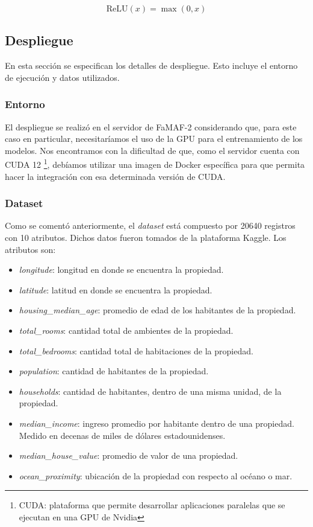 \documentclass[11pt]{article}
\let\Oldsubsection\subsection
\renewcommand{\subsection}{\FloatBarrier\Oldsubsection}
\let\Oldsubsubsection\subsubsection
\renewcommand{\subsubsection}{\FloatBarrier\Oldsubsubsection}
\newcommand{\english}[1]{\textit{#1}}
\begin{document}
\begin{equation}
\text{ReLU}(x) = \max(0, x)
\end{equation}


\subsection{Despliegue}

En esta sección se especifican los detalles de despliegue. Esto incluye el entorno de ejecución y datos utilizados.

\subsubsection{Entorno}

El despliegue se realizó en el servidor de FaMAF-2 considerando que, para este caso en particular, necesitaríamos el uso de la GPU para el entrenamiento de los modelos. Nos encontramos con la dificultad de que, como el servidor cuenta con CUDA 12 \footnote{CUDA: plataforma que permite desarrollar aplicaciones paralelas que se ejecutan en una GPU de Nvidia}, debíamos utilizar una imagen de Docker específica para que permita hacer la integración con esa determinada versión de CUDA.

\subsubsection{Dataset}

Como se comentó anteriormente, el \english{dataset} está compuesto por 20640 registros con 10 atributos. Dichos datos fueron tomados de la plataforma Kaggle. Los atributos son:

\begin{itemize}
    \item \english{longitude}: longitud en donde se encuentra la propiedad.
    \item \english{latitude}: latitud en donde se encuentra la propiedad.
    \item \english{housing\_median\_age}: promedio de edad de los habitantes de la propiedad.
    \item \english{total\_rooms}: cantidad total de ambientes de la propiedad.
    \item \english{total\_bedrooms}: cantidad total de habitaciones de la propiedad.
    \item \english{population}: cantidad de habitantes de la propiedad.
    \item \english{households}: cantidad de habitantes, dentro de una misma unidad, de la propiedad.
    \item \english{median\_income}: ingreso promedio por habitante dentro de una propiedad. Medido en decenas de miles de dólares estadounidenses.
    \item \english{median\_house\_value}: promedio de valor de una propiedad.
    \item \english{ocean\_proximity}: ubicación de la propiedad con respecto al océano o mar.
\end{itemize}
\end{document}
